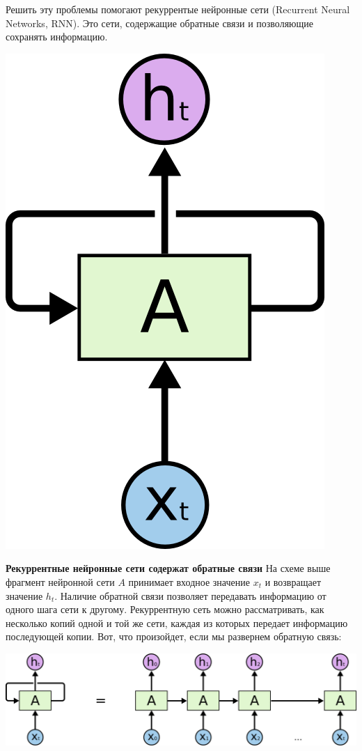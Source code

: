 \documentclass[12pt, a4paper, titlepage]{extreport}
\begin{document}
	Решить эту проблемы помогают рекуррентые нейронные сети (Recurrent Neural Networks, RNN). Это сети, содержащие обратные связи и позволяющие сохранять информацию.\\
	\begin{center} 
	\includegraphics[scale=0.25]{neuron.png}\\
	\end{center}
	\textbf{Рекуррентные нейронные сети содержат обратные связи} На схеме выше фрагмент нейронной сети $A$  принимает входное значение $x_t$ и возвращает значение $h_t$. Наличие обратной связи позволяет передавать информацию от одного шага сети к другому. Рекуррентную сеть можно рассматривать, как несколько копий одной и той же сети, каждая из которых передает информацию последующей копии. Вот, что произойдет, если мы развернем обратную связь:
		\begin{center} 
		\includegraphics[scale=0.2]{rnn_returned.png}\\
	\end{center}
\end{document}
